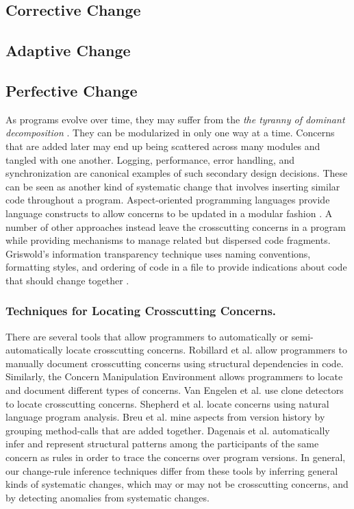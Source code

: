\documentclass[runningheads,a4paper]{llncs}
\begin{document}
\subsection{Corrective Change}
\label{sec:corrective}
 

\subsection{Adaptive Change}
\label{sec:adaptive}
 

\subsection{Perfective Change}
\label{sec:perfective}

As programs evolve over time, they may suffer from the {\it the tyranny of dominant decomposition} \cite{Tarr1999}. They can be modularized in only one way at a time. Concerns that are added later may end up being scattered across many modules and tangled with one another.  Logging, performance, error handling, and synchronization are canonical examples of such secondary design decisions.  These can be seen as another kind of systematic change that involves inserting similar code throughout a program.  Aspect-oriented programming languages provide language constructs to allow concerns to be updated in a modular fashion \cite{Kiczales2001:OA}. A number of other approaches instead leave the crosscutting concerns in a program while providing mechanisms to manage related but dispersed code fragments.  Griswold's information transparency technique uses naming conventions, formatting styles, and ordering of code in a file to provide indications about code that should change together \cite{Griswold2001}. 

\subsubsection{Techniques for Locating Crosscutting Concerns.}
There are several tools that allow programmers to automatically or semi-automatically locate crosscutting concerns. Robillard et al. \cite{Robillard2003} allow programmers to manually document crosscutting concerns using structural dependencies in code. Similarly, the Concern Manipulation Environment \cite{Harrison2005} allows programmers to locate and document different types of concerns. 
Van Engelen et al. \cite{VanEngelen2005} use clone detectors to locate crosscutting concerns. Shepherd et al. \cite{Shepherd2007} locate concerns using natural language program analysis.  Breu et al. \cite{Breu2006} mine aspects from version history by grouping method-calls that are added together. Dagenais et al. \cite{Dagenais2007} automatically infer and represent structural patterns among the participants of the same concern as rules in order to trace the concerns over program versions. In general, our change-rule inference techniques differ from these tools by inferring general kinds of systematic changes, which may or may not be crosscutting concerns, and by detecting anomalies from systematic changes. 
\end{document}
